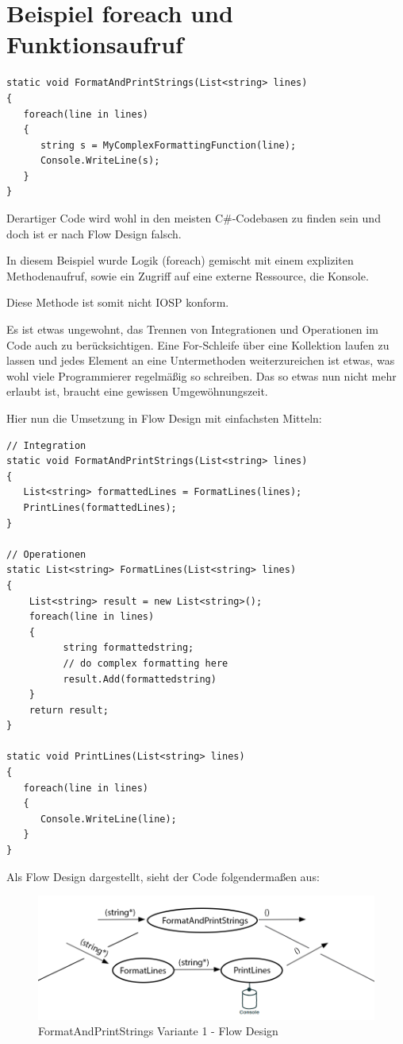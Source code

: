 \section{Beispiel foreach und Funktionsaufruf}




\begin{lstlisting}[caption=FormatAndPrintStrings nicht IOSP-konfrom]
static void FormatAndPrintStrings(List<string> lines)
{
   foreach(line in lines)
   {
      string s = MyComplexFormattingFunction(line);
      Console.WriteLine(s);
   }
}
\end{lstlisting}
Derartiger Code wird wohl in den meisten C\#-Codebasen zu finden sein und doch ist er nach Flow Design falsch.

In diesem Beispiel wurde Logik (foreach) gemischt mit einem expliziten
Methodenaufruf, sowie ein Zugriff auf eine externe Ressource, die
Konsole.

Diese Methode ist somit nicht IOSP konform.

Es ist etwas ungewohnt, das Trennen von Integrationen und Operationen im Code auch zu berücksichtigen.
Eine For-Schleife über eine Kollektion laufen zu lassen und jedes Element an eine Untermethoden weiterzureichen ist etwas,
was wohl viele Programmierer regelmäßig so schreiben.
Das so etwas nun nicht mehr erlaubt ist, braucht eine gewissen Umgewöhnungszeit.

\bigskip

Hier nun die Umsetzung in Flow Design mit einfachsten Mitteln:

\begin{lstlisting}[caption=FormatAndPrintStrings Variante 1]
// Integration
static void FormatAndPrintStrings(List<string> lines)
{
   List<string> formattedLines = FormatLines(lines);
   PrintLines(formattedLines);
}

// Operationen
static List<string> FormatLines(List<string> lines)
{
    List<string> result = new List<string>();
    foreach(line in lines)
    {
          string formattedstring;
          // do complex formatting here
          result.Add(formattedstring)
    }
    return result;
}

static void PrintLines(List<string> lines)
{
   foreach(line in lines)
   {
      Console.WriteLine(line);
   }
}
\end{lstlisting}


Als Flow Design dargestellt, sieht der Code folgendermaßen aus:
\begin{figure}[H]
	\centering
	\includegraphics[width=1\linewidth]{./img/flowForeach1.png}
	\caption{FormatAndPrintStrings Variante 1 - Flow Design}
\end{figure}



